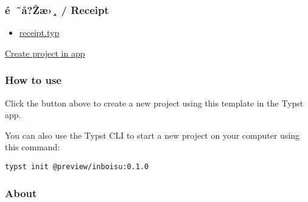 \subsubsection{é~˜å?Žæ›¸ / Receipt}\label{uxe9-uxe5ux17euxe6-receipt}


\begin{itemize}
\tightlist
\item
  \href{https://github.com/typst/packages/raw/main/packages/preview/inboisu/0.1.0/template/receipt.typ}{receipt.typ}
\end{itemize}

\href{/app?template=inboisu&version=0.1.0}{Create project in app}

\subsubsection{How to use}\label{how-to-use}

Click the button above to create a new project using this template in
the Typst app.

You can also use the Typst CLI to start a new project on your computer
using this command:

\begin{verbatim}
typst init @preview/inboisu:0.1.0
\end{verbatim}



\subsubsection{About}\label{about}

